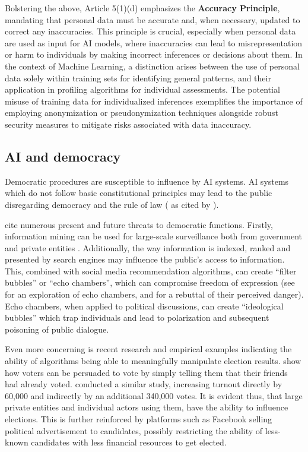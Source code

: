 \documentclass{article}
\begin{document}
Bolstering the above, Article 5(1)(d) emphasizes the \textbf{Accuracy Principle}, mandating that personal data must be accurate and, when necessary, updated to correct any inaccuracies. This principle is crucial, especially when personal data are used as input for AI models, where inaccuracies can lead to misrepresentation or harm to individuals by making incorrect inferences or decisions about them. In the context of Machine Learning, a distinction arises between the use of personal data solely within training sets for identifying general patterns, and their application in profiling algorithms for individual assessments. The potential misuse of training data for individualized inferences exemplifies the importance of employing anonymization or pseudonymization techniques alongside robust security measures to mitigate risks associated with data inaccuracy.


\subsection{AI and democracy}
\label{ssec:democracy}

Democratic procedures are susceptible to influence by AI systems. AI systems which do not follow basic constitutional principles may lead to the public disregarding democracy and the rule of law (\cite{nemitz2018} as cited by \cite{mitrou}).

\cite{wagner2018} cite numerous present and future threats to democratic functions.  Firstly, information mining can be used for large-scale surveillance both from government and private entities \cite{moon2023}. Additionally, the way information is indexed, ranked and presented by search engines may influence the public's access to information. This, combined with social media recommendation algorithms, can create “filter bubbles” or “echo chambers”, which can compromise freedom of expression (see \cite{pasquale2016} for an exploration of echo chambers, and \cite{zuiderveen2016} for a rebuttal of their perceived danger). Echo chambers, when applied to political discussions, can create “ideological bubbles” which trap individuals and lead to polarization and subsequent poisoning of public dialogue. %

Even more concerning is recent research and empirical examples indicating the ability of algorithms being able to meaningfully manipulate election results. \cite{bond2012} show how voters can be persuaded to vote by simply telling them that their friends had already voted. \cite{zittrain2014} conducted a similar study, increasing turnout directly by 60,000 and indirectly by an additional 340,000 votes. It is evident thus, that large private entities and individual actors using them, have the ability to influence elections. This is further reinforced by platforms such as Facebook selling political advertisement to candidates, possibly restricting the ability of less-known candidates with less financial resources to get elected. 
\end{document}
